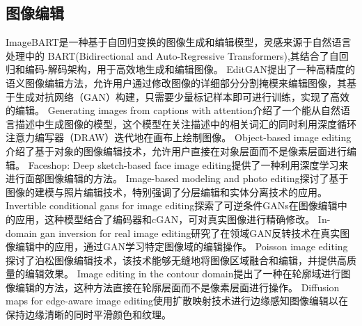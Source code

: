 \documentclass[a4paper,AutoFakeBold,oneside,12pt]{book}
\begin{document}
\subsection{图像编辑}
ImageBART\cite{esser2021imagebart}是一种基于自回归变换的图像生成和编辑模型，灵感来源于自然语言处理中的 BART(Bidirectional and Auto-Regressive Transformers)\cite{lewis2019bart},其结合了自回归和编码-解码架构，用于高效地生成和编辑图像。
EditGAN\cite{ling2021editgan}提出了一种高精度的语义图像编辑方法，允许用户通过修改图像的详细部分分割掩模来编辑图像，其基于生成对抗网络（GAN）构建，只需要少量标记样本即可进行训练，实现了高效的编辑。
Generating images from captions with attention\cite{mansimov2015generating}介绍了一个能从自然语言描述中生成图像的模型，这个模型在关注描述中的相关词汇的同时利用深度循环注意力编写器（DRAW）迭代地在画布上绘制图像。
Object-based image editing\cite{barrett2002object}介绍了基于对象的图像编辑技术，允许用户直接在对象层面而不是像素层面进行编辑。
Faceshop: Deep sketch-based face image editing\cite{portenier2018faceshop}提供了一种利用深度学习来进行面部图像编辑的方法。
Image-based modeling and photo editing\cite{oh2001image}探讨了基于图像的建模与照片编辑技术，特别强调了分层编辑和实体分离技术的应用。
Invertible conditional gans for image editing\cite{perarnau2016invertible}探索了可逆条件GANs在图像编辑中的应用，这种模型结合了编码器和cGAN，可对真实图像进行精确修改。
In-domain gan inversion for real image editing\cite{zhu2020domain}研究了在领域GAN反转技术在真实图像编辑中的应用，通过GAN学习特定图像域的编辑操作。
Poisson image editing\cite{di2016poisson}探讨了泊松图像编辑技术，该技术能够无缝地将图像区域融合和编辑，并提供高质量的编辑效果。
Image editing in the contour domain\cite{elder1998image}提出了一种在轮廓域进行图像编辑的方法，这种方法直接在轮廓层面而不是像素层面进行操作。
Diffusion maps for edge-aware image editing\cite{farbman2010diffusion}使用扩散映射技术进行边缘感知图像编辑以在保持边缘清晰的同时平滑颜色和纹理。
\end{document}
